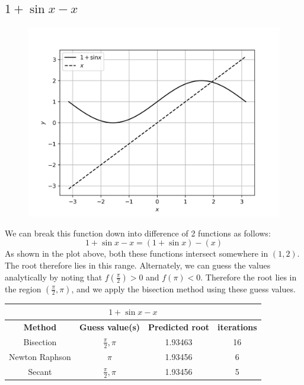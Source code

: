 \documentclass[12,a4paper]{article}
\begin{document}
    \subsection{$1 + \sin x - x$}
    \begin{figure}[H]
        \centering
        \includegraphics[width = \textwidth]{plots/p9.png}
        \label{fig:my_label}
    \end{figure}
    We can break this function down into difference of 2 functions as follows:
    \begin{equation}
        1 + \sin x - x = (1 + \sin x) - (x)
    \end{equation}
    As shown in the plot above, both these functions intersect somewhere in $(1, 2)$. The root therefore lies in this range. Alternately, we can guess the values analytically by noting that $f(\frac{\pi}{2})>0$ and $f(\pi)<0$. Therefore the root lies in the region $(\frac{\pi}{2}, \pi)$, and we apply the bisection method using these guess values.
    \begin{table}[h!]
        \centering
        \begin{tabular}{|c|c c c|} 
            \hline
            \multicolumn{4}{|c|}{$1 + \sin x - x$}\\
            \hline
            \textbf{Method}&\textbf{Guess value(s)}&\textbf{Predicted root}&\textbf{iterations} \\ [0.5ex] 
            \hline
            Bisection & $\frac{\pi}{2}, \pi$ & 1.93463 & 16 \\ 
            Newton Raphson & $\pi$ & 1.93456 & 6 \\
            Secant &  $\frac{\pi}{2}, \pi$ & 1.93456 & 5 \\[1ex] 
            \hline
        \end{tabular}
    \end{table}
\end{document}
